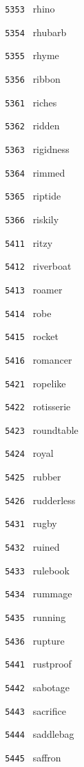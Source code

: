\documentclass[11pt]{article}
\begin{document}
\begin{multicols}{6}
\noindent \texttt{ 5353 } rhino  \par
\noindent \texttt{ 5354 } rhubarb  \par
\noindent \texttt{ 5355 } rhyme  \par
\noindent \texttt{ 5356 } ribbon  \par
\noindent \texttt{ 5361 } riches  \par
\noindent \texttt{ 5362 } ridden  \par
\noindent \texttt{ 5363 } rigidness  \par
\noindent \texttt{ 5364 } rimmed  \par
\noindent \texttt{ 5365 } riptide  \par
\noindent \texttt{ 5366 } riskily  \par
\noindent \texttt{ 5411 } ritzy  \par
\noindent \texttt{ 5412 } riverboat  \par
\noindent \texttt{ 5413 } roamer  \par
\noindent \texttt{ 5414 } robe  \par
\noindent \texttt{ 5415 } rocket  \par
\noindent \texttt{ 5416 } romancer  \par
\noindent \texttt{ 5421 } ropelike  \par
\noindent \texttt{ 5422 } rotisserie  \par
\noindent \texttt{ 5423 } roundtable  \par
\noindent \texttt{ 5424 } royal  \par
\noindent \texttt{ 5425 } rubber  \par
\noindent \texttt{ 5426 } rudderless  \par
\noindent \texttt{ 5431 } rugby  \par
\noindent \texttt{ 5432 } ruined  \par
\noindent \texttt{ 5433 } rulebook  \par
\noindent \texttt{ 5434 } rummage  \par
\noindent \texttt{ 5435 } running  \par
\noindent \texttt{ 5436 } rupture  \par
\noindent \texttt{ 5441 } rustproof  \par
\noindent \texttt{ 5442 } sabotage  \par
\noindent \texttt{ 5443 } sacrifice  \par
\noindent \texttt{ 5444 } saddlebag  \par
\noindent \texttt{ 5445 } saffron  \par

\end{multicols}
\end{document}
